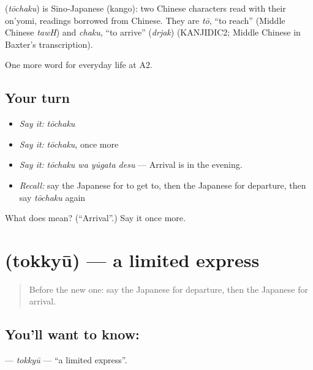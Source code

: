 \begin{cousinweb}
\textbf{} (\emph{tōchaku}) is Sino-Japanese (kango): two Chinese characters read with their on'yomi, readings borrowed from Chinese. They are \emph{tō}, \textquotedblleft{}to reach\textquotedblright{} (Middle Chinese \emph{tawH}) and \emph{chaku}, \textquotedblleft{}to arrive\textquotedblright{} (\emph{drjak}) (KANJIDIC2; Middle Chinese in Baxter's transcription).
\end{cousinweb}

\begin{grammarlens}[title={What you've built}]
One more word for everyday life at A2.
\end{grammarlens}

\subsection*{Your turn}
\begin{itemize}
\raggedright
  \item \emph{Say it:} \emph{tōchaku}
  \item \emph{Say it:} \emph{tōchaku}, once more
  \item \emph{Say it:} \emph{tōchaku wa yūgata desu} — Arrival is in the evening.
  \item \emph{Recall:} say the Japanese for to get to, then the Japanese for departure, then say \emph{tōchaku} again
\end{itemize}

\begin{tcolorbox}[breakable,colback=teal!4,colframe=teal!35!black,title={Before you move on}]
What does  mean? (\textquotedblleft{}Arrival\textquotedblright{}.) Say it once more.
\end{tcolorbox}
\section[\texorpdfstring{\ja{とっきゅう} (tokkyū)}{とっきゅう (tokkyū)}]{ (tokkyū) — a limited express}

\label{lesson:JA-C199-tokkyuu}



\begin{quote}
Before the new one: say the Japanese for departure, then the Japanese for arrival.
\end{quote}

\subsection*{You'll want to know: }
\textbf{} — \emph{tokkyū} — \textquotedblleft{}a limited express\textquotedblright{}.

